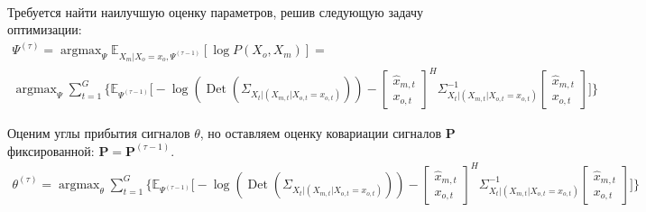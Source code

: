 \documentclass[11pt]{article}
\newcommand{\Expect}{\mathbb{E}}
\DeclareMathOperator*{\argmax}{argmax}
\DeclareMathOperator{\Det}{Det}
\begin{document}
\begin{equation*}
\begin{gathered}
\end{gathered}
\end{equation*}
\begin{center}
\fontsize{14}{18}\selectfont {}
\end{center}
Требуется найти наилучшую оценку параметров, решив следующую задачу оптимизации:
\begin{equation*}
\begin{gathered}
\Psi^{(\tau)}=\argmax_{\Psi} \Expect_{X_m|X_o=x_o, \Psi^{(\tau-1)}}[\log P(X_o, X_m)] =\\
\argmax_{\Psi} \sum_{t=1}^G \bigg \{   \Expect_{\Psi^{(\tau-1)}}\bigg[- \log (\Det(\Sigma_{X_t|(X_{m,t}|X_{o,t}=x_{o,t})})) - 
\begin{bmatrix} \hat{x}_{m,t} \\  x_{o,t} \end{bmatrix}^H \Sigma_{X_t|(X_{m,t}|X_{o,t}=x_{o,t})}^{-1}
\begin{bmatrix} \hat{x}_{m,t} \\  x_{o,t} \end{bmatrix}\bigg] \bigg\}
\end{gathered}
\end{equation*}
\begin{center}
\fontsize{14}{18}\selectfont {}
\end{center}
Оценим углы прибытия сигналов $\theta$, но оставляем оценку ковариации сигналов $\mathbf{P}$ фиксированной: $\mathbf{P} = \mathbf{P}^{(\tau-1)}$.
\begin{equation*}
\begin{gathered}
\theta^{(\tau)}=\argmax_{\theta} \sum_{t=1}^G \bigg \{   \Expect_{\Psi^{(\tau-1)}}\bigg[- \log (\Det(\Sigma_{X_t|(X_{m,t}|X_{o,t}=x_{o,t})})) - 
\begin{bmatrix} \hat{x}_{m,t} \\  x_{o,t} \end{bmatrix}^H \Sigma_{X_t|(X_{m,t}|X_{o,t}=x_{o,t})}^{-1}
\begin{bmatrix} \hat{x}_{m,t} \\  x_{o,t} \end{bmatrix}\bigg] \bigg\}
\end{gathered}
\end{equation*}
\begin{center}
\fontsize{14}{18}\selectfont {}
\end{center}
\end{document}
